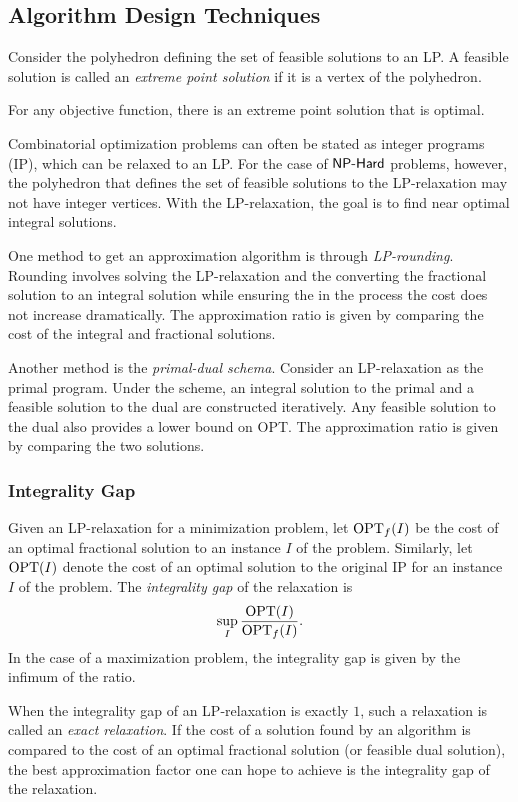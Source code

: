 \subsection{Algorithm Design Techniques}

\begin{definition}
    Consider the polyhedron defining the set of feasible solutions to an LP. A feasible solution is called 
    an \emph{extreme point solution} if it is a vertex of the polyhedron. 
    \label{def:extreme_point_sol}
\end{definition}

\begin{theorem}
    For any objective function, there is an extreme point solution that is optimal. 
    \label{thm:opt_extreme_point}
\end{theorem}

Combinatorial optimization problems can often be stated as integer programs (IP), which can be relaxed to an LP. 
For the case of $\textsf{NP-Hard}$ problems, however, the polyhedron that defines the set of feasible solutions to the LP-relaxation 
may not have integer vertices. With the LP-relaxation, the goal is to find near optimal integral solutions. 

One method to get an approximation algorithm is through \emph{LP-rounding}. Rounding involves solving the 
LP-relaxation and the converting the fractional solution to an integral solution while ensuring the in the process the 
cost does not increase dramatically. The approximation ratio is given by comparing the cost of the integral and fractional solutions. 

Another method is the \emph{primal-dual schema}. Consider an LP-relaxation as the primal program. Under the scheme, 
an integral solution to the primal and a feasible solution to the dual are constructed iteratively.
Any feasible solution to the dual also provides a lower bound on OPT. The approximation ratio is given by 
comparing the two solutions.  

\subsubsection{Integrality Gap}

\begin{definition}
    Given an LP-relaxation for a minimization problem, let $\mathrm{OPT}_{f}(I)$ be the cost 
    of an optimal fractional solution to an instance $I$ of the problem. Similarly, let 
    $\mathrm{OPT}(I)$ denote the cost of an optimal solution to the original IP for an instance $I$ of the problem. 
    The \emph{integrality gap} of the relaxation is 
    \[
        \sup_{I} \frac{\mathrm{OPT}(I)}{\mathrm{OPT}_f (I)}. 
    \]
    In the case of a maximization problem, the integrality gap is given by the infimum of the ratio. 
    \label{def:integrality_gap}
\end{definition}

When the integrality gap of an LP-relaxation is exactly $1$, such a relaxation is called an \emph{exact relaxation}.
If the cost of a solution found by an algorithm is compared to the cost of an optimal 
fractional solution (or feasible dual solution), the best approximation factor one can hope to achieve 
is the integrality gap of the relaxation.   